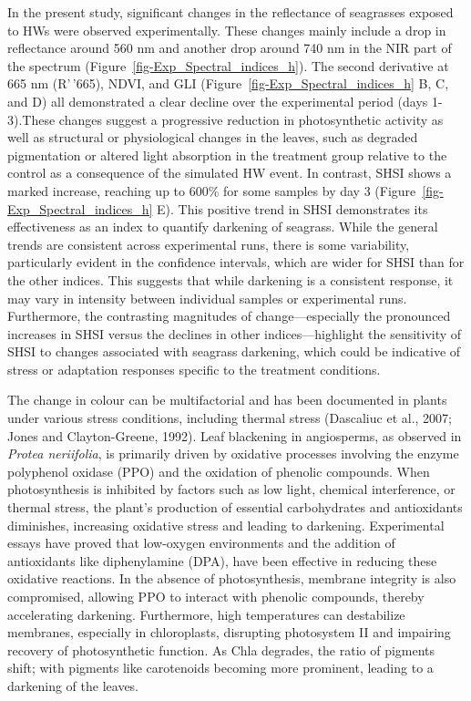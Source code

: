 \documentclass[
  letterpaper,
  11pt,
  english,
  singlespacing,
  headsepline]{MastersDoctoralThesis}
\begin{document}
\begin{spacing}{1.5}
In the present study, significant changes in the reflectance of
seagrasses exposed to HWs were observed experimentally. These changes
mainly include a drop in reflectance around 560 nm and another drop
around 740 nm in the NIR part of the spectrum
(Figure~\ref{fig-Exp_Spectral_indices_h}). The second derivative at 665
nm (R'\,'665), NDVI, and GLI (Figure~\ref{fig-Exp_Spectral_indices_h} B,
C, and D) all demonstrated a clear decline over the experimental period
(days 1-3).These changes suggest a progressive reduction in
photosynthetic activity as well as structural or physiological changes
in the leaves, such as degraded pigmentation or altered light absorption
in the treatment group relative to the control as a consequence of the
simulated HW event. In contrast, SHSI shows a marked increase, reaching
up to 600\% for some samples by day 3
(Figure~\ref{fig-Exp_Spectral_indices_h} E). This positive trend in SHSI
demonstrates its effectiveness as an index to quantify darkening of
seagrass. While the general trends are consistent across experimental
runs, there is some variability, particularly evident in the confidence
intervals, which are wider for SHSI than for the other indices. This
suggests that while darkening is a consistent response, it may vary in
intensity between individual samples or experimental runs. Furthermore,
the contrasting magnitudes of change---especially the pronounced
increases in SHSI versus the declines in other indices---highlight the
sensitivity of SHSI to changes associated with seagrass darkening, which
could be indicative of stress or adaptation responses specific to the
treatment conditions.

The change in colour can be multifactorial and has been documented in
plants under various stress conditions, including thermal stress
(Dascaliuc et al., 2007; Jones and Clayton-Greene, 1992). Leaf
blackening in angiosperms, as observed in \emph{Protea neriifolia}, is
primarily driven by oxidative processes involving the enzyme polyphenol
oxidase (PPO) and the oxidation of phenolic compounds. When
photosynthesis is inhibited by factors such as low light, chemical
interference, or thermal stress, the plant's production of essential
carbohydrates and antioxidants diminishes, increasing oxidative stress
and leading to darkening. Experimental essays have proved that
low-oxygen environments and the addition of antioxidants like
diphenylamine (DPA), have been effective in reducing these oxidative
reactions. In the absence of photosynthesis, membrane integrity is also
compromised, allowing PPO to interact with phenolic compounds, thereby
accelerating darkening. Furthermore, high temperatures can destabilize
membranes, especially in chloroplasts, disrupting photosystem II and
impairing recovery of photosynthetic function. As Chla degrades, the
ratio of pigments shift; with pigments like carotenoids becoming more
prominent, leading to a darkening of the leaves.


\end{spacing}
\end{document}
